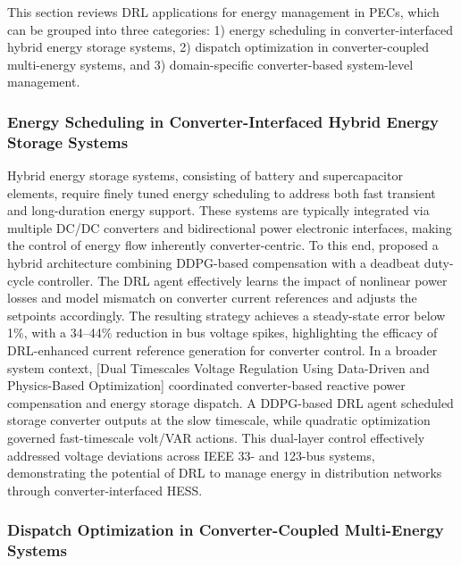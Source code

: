 This section reviews DRL applications for energy management in PECs, which can be grouped into three categories: 1) energy scheduling in converter-interfaced hybrid energy storage systems, 2) dispatch optimization in converter-coupled multi-energy systems, and 3) domain-specific converter-based system-level management.

\subsubsection{Energy Scheduling in Converter-Interfaced Hybrid Energy Storage Systems}

Hybrid energy storage systems, consisting of battery and supercapacitor elements, require finely tuned energy scheduling to address both fast transient and long-duration energy support. These systems are typically integrated via multiple DC/DC converters and bidirectional power electronic interfaces, making the control of energy flow inherently converter-centric. To this end, \cite{zhang2025deep} proposed a hybrid architecture combining DDPG-based compensation with a deadbeat duty-cycle controller. The DRL agent effectively learns the impact of nonlinear power losses and model mismatch on converter current references and adjusts the setpoints accordingly. The resulting strategy achieves a steady-state error below 1\%, with a 34–44\% reduction in bus voltage spikes, highlighting the efficacy of DRL-enhanced current reference generation for converter control. In a broader system context, [Dual Timescales Voltage Regulation Using Data-Driven and Physics-Based Optimization] coordinated converter-based reactive power compensation and energy storage dispatch. A DDPG-based DRL agent scheduled storage converter outputs at the slow timescale, while quadratic optimization governed fast-timescale volt/VAR actions. This dual-layer control effectively addressed voltage deviations across IEEE 33- and 123-bus systems, demonstrating the potential of DRL to manage energy in distribution networks through converter-interfaced HESS.

\subsubsection{Dispatch Optimization in Converter-Coupled Multi-Energy Systems}

